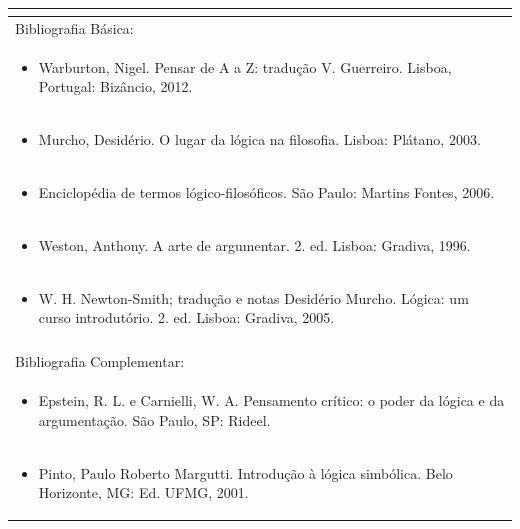 \documentclass[11pt]{article}
\begin{document}
\begin{center}
\begin{longtable}{|p{4cm}|p{4cm}|p{4cm}|p{4cm}|}
\multicolumn{4}{|p{\dimexpr 16cm + 6\tabcolsep\relax}|}{}\\
\hline
\multicolumn{4}{|p{16cm}|}{Bibliografia Básica:}\\*
\multicolumn{4}{|p{\dimexpr 16cm + 6\tabcolsep\relax}|}{\begin{itemize}\item Warburton, Nigel. Pensar de A a Z: tradução V. Guerreiro. Lisboa, Portugal: Bizâncio, 2012.\end{itemize}}\\
\multicolumn{4}{|p{\dimexpr 16cm + 6\tabcolsep\relax}|}{\begin{itemize}\item Murcho, Desidério. O lugar da lógica na filosofia. Lisboa: Plátano, 2003.\end{itemize}}\\
\multicolumn{4}{|p{\dimexpr 16cm + 6\tabcolsep\relax}|}{\begin{itemize}\item Enciclopédia de termos lógico-filosóficos. São Paulo: Martins Fontes, 2006.\end{itemize}}\\
\multicolumn{4}{|p{\dimexpr 16cm + 6\tabcolsep\relax}|}{\begin{itemize}\item Weston, Anthony. A arte de argumentar. 2. ed. Lisboa: Gradiva, 1996.\end{itemize}}\\
\multicolumn{4}{|p{\dimexpr 16cm + 6\tabcolsep\relax}|}{\begin{itemize}\item W. H. Newton-Smith; tradução e notas Desidério Murcho. Lógica: um curso introdutório. 2. ed. Lisboa: Gradiva, 2005.\end{itemize}}\\
\multicolumn{4}{|p{16cm}|}{}\\
\hline
\multicolumn{4}{|p{16cm}|}{Bibliografia Complementar:}\\*
\multicolumn{4}{|p{\dimexpr 16cm + 6\tabcolsep\relax}|}{\begin{itemize}\item Epstein, R. L. e Carnielli, W. A. Pensamento crítico: o poder da lógica e da argumentação. São Paulo, SP: Rideel.\end{itemize}}\\
\multicolumn{4}{|p{\dimexpr 16cm + 6\tabcolsep\relax}|}{\begin{itemize}\item Pinto, Paulo Roberto Margutti. Introdução à lógica simbólica. Belo Horizonte, MG: Ed. UFMG, 2001.\end{itemize}}\\

\end{longtable}
\end{center}
\end{document}
